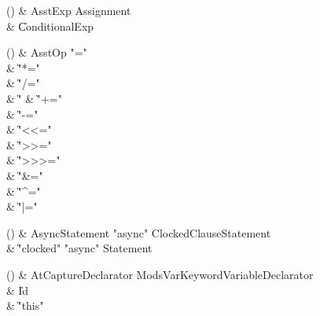 \begin{bbgrammarappendix}

() & AsstExp \label{prod:AsstExp}  \: Assignment  \\

 &    \| ConditionalExp \\

\end{bbgrammarappendix}

\begin{bbgrammarappendix}

() & AsstOp \label{prod:AsstOp}  \: \xcd"="  \\

 &    \| \xcd"*=" \\
 &    \| \xcd"/=" \\
 &    \| \xcd"%
 &    \| \xcd"+=" \\
 &    \| \xcd"-=" \\
 &    \| \xcd"<<=" \\
 &    \| \xcd">>=" \\
 &    \| \xcd">>>=" \\
 &    \| \xcd"&=" \\
 &    \| \xcd"^=" \\
 &    \| \xcd"|=" \\

\end{bbgrammarappendix}

\begin{bbgrammarappendix}

() & AsyncStatement \label{prod:AsyncStatement}  \: \xcd"async" ClockedClause\opt Statement  \\

 &    \| \xcd"clocked" \xcd"async" Statement \\

\end{bbgrammarappendix}

\begin{bbgrammarappendix}

() & AtCaptureDeclarator \label{prod:AtCaptureDeclarator}  \: Mods\opt VarKeyword\opt VariableDeclarator  \\

 &    \| Id \\
 &    \| \xcd"this" \\

\end{bbgrammarappendix}

